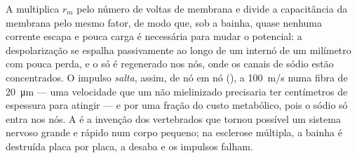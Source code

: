 \begin{proposition}\label{prop:b2:neurons-synapses:myelin}
A  multiplica $r_m$ pelo número de voltas de membrana e divide a
capacitância da membrana pelo mesmo fator, de modo que, sob a bainha,
quase nenhuma corrente escapa e pouca carga é necessária para mudar o
potencial: a despolarização se espalha passivamente ao longo de um
internó de um milímetro com pouca perda, e o  só é
regenerado nos nós, onde os canais de sódio estão concentrados. O
impulso \emph{salta}, assim, de nó em nó (\emph{}),
a \qty{100}{m/s} numa fibra de \qty{20}{\micro m} --- uma velocidade que
um  não mielinizado precisaria ter centímetros de espessura para
atingir --- e por uma fração do custo metabólico, pois o sódio só entra
nos nós. A  é a invenção dos vertebrados que tornou possível um
sistema nervoso grande e rápido num corpo pequeno; na esclerose
múltipla, a bainha é destruída placa por placa, a 
desaba e os impulsos falham.
\end{proposition}

